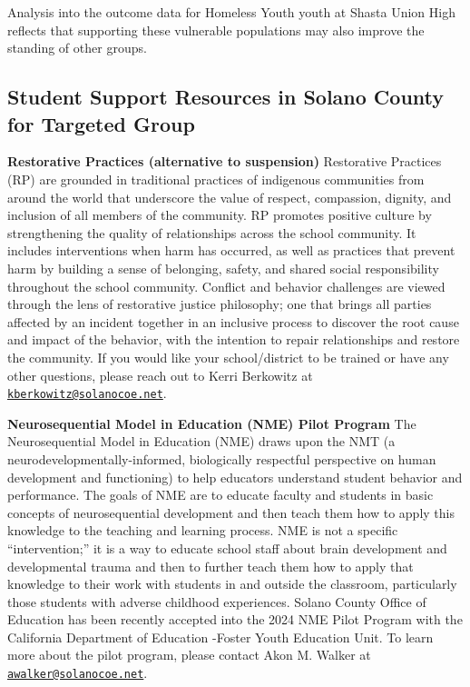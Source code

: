 \documentclass[
  10pt,
  letterpaper,
  DIV=11,
  numbers=noendperiod]{scrartcl}
\begin{document}
Analysis into the outcome data for Homeless Youth youth at Shasta Union
High reflects that supporting these vulnerable populations may also
improve the standing of other groups.

\subsection{Student Support Resources in Solano County for Targeted
Group}\label{student-support-resources-in-solano-county-for-targeted-group}

\textbf{Restorative Practices (alternative to suspension)} Restorative
Practices (RP) are grounded in traditional practices of indigenous
communities from around the world that underscore the value of respect,
compassion, dignity, and inclusion of all members of the community. RP
promotes positive culture by strengthening the quality of relationships
across the school community. It includes interventions when harm has
occurred, as well as practices that prevent harm by building a sense of
belonging, safety, and shared social responsibility throughout the
school community. Conflict and behavior challenges are viewed through
the lens of restorative justice philosophy; one that brings all parties
affected by an incident together in an inclusive process to discover the
root cause and impact of the behavior, with the intention to repair
relationships and restore the community. If you would like your
school/district to be trained or have any other questions, please reach
out to Kerri Berkowitz at
\href{mailto:kberkowitz@solanocoe.net}{\nolinkurl{kberkowitz@solanocoe.net}}.

\textbf{Neurosequential Model in Education (NME) Pilot Program} The
Neurosequential Model in Education (NME) draws upon the NMT (a
neurodevelopmentally-informed, biologically respectful perspective on
human development and functioning) to help educators understand student
behavior and performance. The goals of NME are to educate faculty and
students in basic concepts of neurosequential development and then teach
them how to apply this knowledge to the teaching and learning process.
NME is not a specific ``intervention;'' it is a way to educate school
staff about brain development and developmental trauma and then to
further teach them how to apply that knowledge to their work with
students in and outside the classroom, particularly those students with
adverse childhood experiences. Solano County Office of Education has
been recently accepted into the 2024 NME Pilot Program with the
California Department of Education -Foster Youth Education Unit. To
learn more about the pilot program, please contact Akon M. Walker at
\href{mailto:awalker@solanocoe.net}{\nolinkurl{awalker@solanocoe.net}}.
\end{document}
